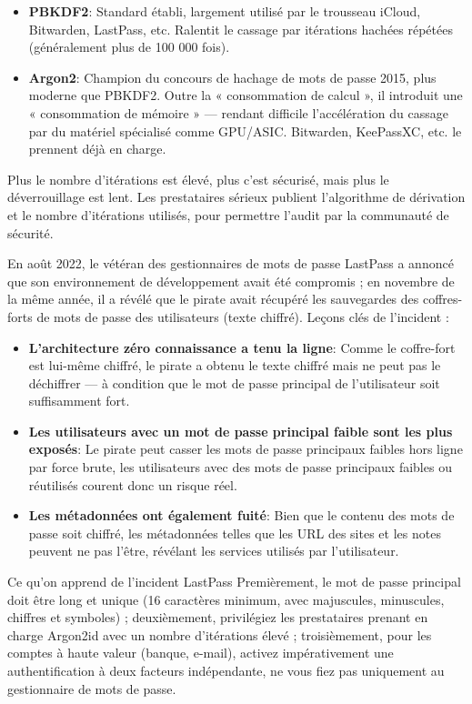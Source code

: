 \begin{itemize}
  \item \textbf{PBKDF2}: Standard établi, largement utilisé par le trousseau iCloud, Bitwarden, LastPass, etc. Ralentit le cassage par itérations hachées répétées (généralement plus de 100 000 fois).
  \item \textbf{Argon2}: Champion du concours de hachage de mots de passe 2015, plus moderne que PBKDF2. Outre la « consommation de calcul », il introduit une « consommation de mémoire » — rendant difficile l'accélération du cassage par du matériel spécialisé comme GPU/ASIC. Bitwarden, KeePassXC, etc. le prennent déjà en charge.
\end{itemize}

Plus le nombre d'itérations est élevé, plus c'est sécurisé, mais plus le déverrouillage est lent. Les prestataires sérieux publient l'algorithme de dérivation et le nombre d'itérations utilisés, pour permettre l'audit par la communauté de sécurité.


En août 2022, le vétéran des gestionnaires de mots de passe LastPass a annoncé que son environnement de développement avait été compromis ; en novembre de la même année, il a révélé que le pirate avait récupéré les sauvegardes des coffres-forts de mots de passe des utilisateurs (texte chiffré). Leçons clés de l'incident :

\begin{itemize}
  \item \textbf{L'architecture zéro connaissance a tenu la ligne}: Comme le coffre-fort est lui-même chiffré, le pirate a obtenu le texte chiffré mais ne peut pas le déchiffrer — à condition que le mot de passe principal de l'utilisateur soit suffisamment fort.
  \item \textbf{Les utilisateurs avec un mot de passe principal faible sont les plus exposés}: Le pirate peut casser les mots de passe principaux faibles hors ligne par force brute, les utilisateurs avec des mots de passe principaux faibles ou réutilisés courent donc un risque réel.
  \item \textbf{Les métadonnées ont également fuité}: Bien que le contenu des mots de passe soit chiffré, les métadonnées telles que les URL des sites et les notes peuvent ne pas l'être, révélant les services utilisés par l'utilisateur.
\end{itemize}

\begin{tcbwarn}{Ce qu'on apprend de l'incident LastPass}
Premièrement, le mot de passe principal doit être long et unique (16 caractères minimum, avec majuscules, minuscules, chiffres et symboles) ; deuxièmement, privilégiez les prestataires prenant en charge Argon2id avec un nombre d'itérations élevé ; troisièmement, pour les comptes à haute valeur (banque, e-mail), activez impérativement une authentification à deux facteurs indépendante, ne vous fiez pas uniquement au gestionnaire de mots de passe.

\end{tcbwarn}

